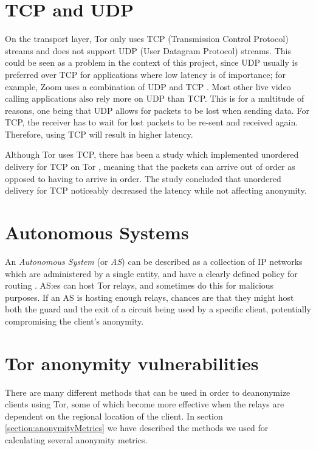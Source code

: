 \documentclass{kththesis}
\begin{document}
\section{TCP and UDP}
On the transport layer, Tor only uses TCP (Transmission Control Protocol) streams \parencite{officialTorOverview} and does not support UDP (User Datagram Protocol) streams. This could be seen as a problem in the context of this project, since UDP usually is preferred over TCP for applications where low latency is of importance; for example, Zoom uses a combination of UDP and TCP \parencite{ZoomTCPandUDP}. Most other live video calling applications also rely more on UDP than TCP. This is for a multitude of reasons, one being that UDP allows for packets to be lost when sending data. For TCP, the receiver has to wait for lost packets to be re-sent and received again. Therefore, using TCP will result in higher latency.

Although Tor uses TCP, there has been a study which implemented unordered delivery for TCP on Tor \parencite{unorderedTCPdelivery}, meaning that the packets can arrive out of order as opposed to having to arrive in order. The study concluded that unordered delivery for TCP noticeably decreased the latency while not affecting anonymity.

\section{Autonomous Systems}
An \emph{Autonomous System} (or \emph{AS}) can be described as a collection of IP networks which are administered by a single entity, and have a clearly defined policy for routing \parencite{hawkinson1996guidelines}. AS:es can host Tor relays, and sometimes do this for malicious purposes. If an AS is hosting enough relays, chances are that they might host both the guard and the exit of a circuit being used by a specific client, potentially compromising the client's anonymity.

\section{Tor anonymity vulnerabilities}
There are many different methods that can be used in order to deanonymize clients using Tor, some of which become more effective when the relays are dependent on the regional location of the client. In section \ref{section:anonymityMetrics} we have described the methods we used for calculating several anonymity metrics.
\end{document}
